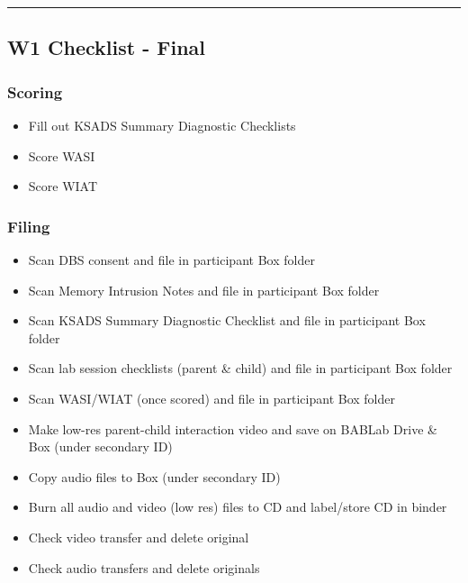 \documentclass[
]{book}
\providecommand{\tightlist}{%
  \setlength{\itemsep}{0pt}\setlength{\parskip}{0pt}}
\begin{document}
\begin{center}\rule{0.5\linewidth}{0.5pt}\end{center}

\hypertarget{w1-checklist---final}{%
\subsection{W1 Checklist - Final}\label{w1-checklist---final}}

\hypertarget{scoring}{%
\subsubsection{Scoring}\label{scoring}}

\begin{itemize}
\tightlist
\item
  Fill out KSADS Summary Diagnostic Checklists
\item
  Score WASI
\item
  Score WIAT
\end{itemize}

\hypertarget{filing-1}{%
\subsubsection{Filing}\label{filing-1}}

\begin{itemize}
\tightlist
\item
  Scan DBS consent and file in participant Box folder
\item
  Scan Memory Intrusion Notes and file in participant Box folder
\item
  Scan KSADS Summary Diagnostic Checklist and file in participant Box folder
\item
  Scan lab session checklists (parent \& child) and file in participant Box folder
\item
  Scan WASI/WIAT (once scored) and file in participant Box folder
\item
  Make low-res parent-child interaction video and save on BABLab Drive \& Box (under secondary ID)
\item
  Copy audio files to Box (under secondary ID)
\item
  Burn all audio and video (low res) files to CD and label/store CD in binder
\item
  Check video transfer and delete original
\item
  Check audio transfers and delete originals
\end{itemize}
\end{document}
